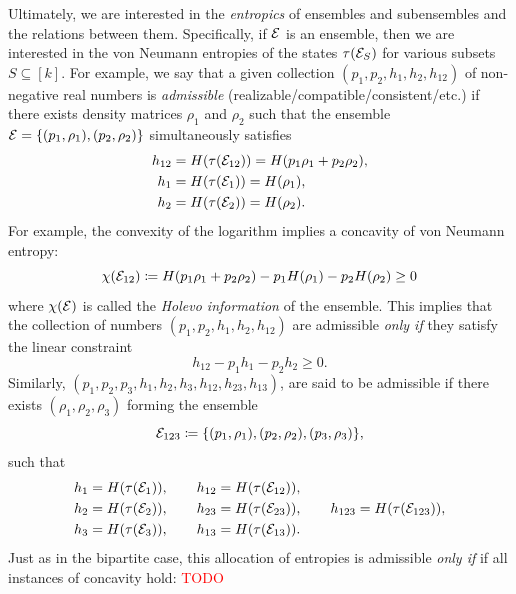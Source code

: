 \documentclass[notitlepage]{article}
\begin{document}
Ultimately, we are interested in the \textit{entropics} of ensembles and subensembles and the relations between them.
Specifically, if $\mathcal E$ is an ensemble, then we are interested in the von Neumann entropies of the states $\tau(\mathcal E_S)$ for various subsets $S \subseteq [k]$.
For example, we say that a given collection $(p_1, p_2, h_1, h_2, h_{12})$ of non-negative real numbers is \textit{admissible} (realizable/compatible/consistent/etc.) if there exists density matrices $\rho_1$ and $\rho_2$ such that the ensemble $\mathcal E = \{(p_1, \rho_1),(p_2,\rho_2)\}$ simultaneously satisfies
\begin{align}
    h_{12} &= H(\tau(\mathcal E_{12})) = H(p_1 \rho_1 + p_2 \rho_2), \\
    h_{1} &= H(\tau(\mathcal E_{1})) = H(\rho_1), \\
    h_{2} &= H(\tau(\mathcal E_{2})) = H(\rho_2).
\end{align}
For example, the convexity of the logarithm implies a concavity of von Neumann entropy:
\begin{equation}
    \chi(\mathcal E_{12}) \coloneqq H(p_1 \rho_1 + p_2 \rho_2) - p_1 H(\rho_1) - p_2 H(\rho_2) \geq 0
\end{equation}
where $\chi(\mathcal E)$ is called the \textit{Holevo information} of the ensemble.
This implies that the collection of numbers $(p_1, p_2, h_1, h_2, h_{12})$ are admissible \textit{only if} they satisfy the linear constraint
\begin{equation}
    h_{12} - p_1 h_1 - p_2 h_2 \geq 0.
\end{equation}
Similarly, $(p_1, p_2, p_3, h_1, h_2, h_3, h_{12}, h_{23}, h_{13})$, are said to be admissible if there exists $(\rho_1, \rho_2, \rho_3)$ forming the ensemble
\begin{equation}
    \mathcal E_{123} \coloneqq \{ (p_1, \rho_1), (p_2, \rho_2), (p_3, \rho_3) \},
\end{equation}
such that
\begin{equation}
    \begin{alignedat}{2}
        h_1 &= H(\tau(\mathcal E_{1})), \qquad h_{12} &&= H(\tau(\mathcal E_{12})), \\
        h_2 &= H(\tau(\mathcal E_{2})), \qquad h_{23} &&= H(\tau(\mathcal E_{23})), \qquad h_{123} = H(\tau(\mathcal E_{123})), \\
        h_3 &= H(\tau(\mathcal E_{3})), \qquad h_{13} &&= H(\tau(\mathcal E_{13})).
    \end{alignedat}
\end{equation}
Just as in the bipartite case, this allocation of entropies is admissible \textit{only if} if all instances of concavity hold:
\textcolor{red}{TODO}
\end{document}
